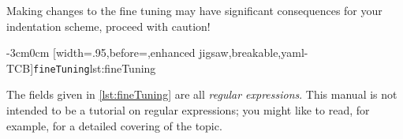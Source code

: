 \documentclass[10pt]{article}
\newenvironment{widepage}{\begin{adjustwidth}{-3cm}{0cm}}{\end{adjustwidth}}
\begin{document}
 \begin{warning}
  Making changes to the fine tuning may have significant consequences for your
  indentation scheme, proceed with caution!
 \end{warning}

 \begin{widepage}
  [width=.95\linewidth,before=\centering,enhanced jigsaw,breakable,yaml-TCB]{\texttt{fineTuning}}{lst:fineTuning}
 \end{widepage}

 The fields given in \cref{lst:fineTuning} are all \emph{regular expressions}. This
 manual is not intended to be a tutorial on regular expressions; you might like to read,
 for example, \cite{masteringregexp} for a detailed covering of the topic.
\end{document}
